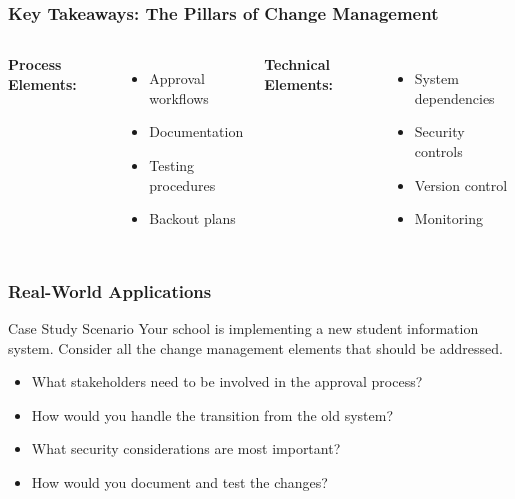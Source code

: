 \documentclass{beamer}
\begin{document}
                    \begin{frame}
                        \frametitle{Key Takeaways: The Pillars of Change Management}
                        \begin{columns}[t]
                        \textbf{Process Elements:}
                        \begin{itemize}
                            \item Approval workflows
                            \item Documentation
                            \item Testing procedures
                            \item Backout plans
                        \end{itemize}
                        \textbf{Technical Elements:}
                        \begin{itemize}
                            \item System dependencies
                            \item Security controls
                            \item Version control
                            \item Monitoring
                        \end{itemize}
                        \end{columns}
                        \end{frame}
                        
                        \begin{frame}
                        \frametitle{Real-World Applications}
                        \begin{block}{Case Study Scenario}
                        Your school is implementing a new student information system. Consider all the change management elements that should be addressed.
                        \end{block}
                        \begin{itemize}
                            \item What stakeholders need to be involved in the approval process?
                            
                            \item How would you handle the transition from the old system?
                            
                            \item What security considerations are most important?
                            
                            \item How would you document and test the changes?
                        \end{itemize}
                        \end{frame}
                        
\end{document}
